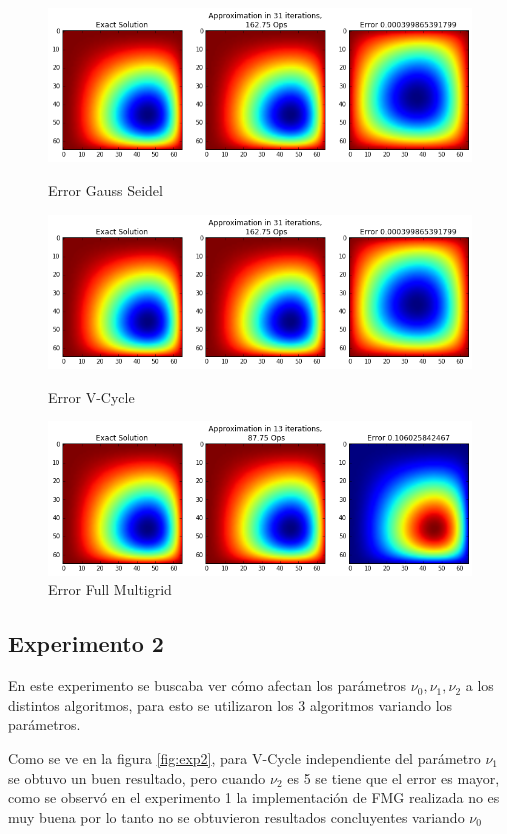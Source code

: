 \documentclass[letter, 10pt]{article}
\begin{document}
\begin{figure}[H]
    \centering
    \includegraphics[scale=0.4]{gs_e.png}
    \caption{Error Gauss Seidel }
    \label{fig:gs_e}
    \includegraphics[scale=0.4]{v_e.png}
    \caption{Error V-Cycle }
    \label{fig:v_e}
    \includegraphics[scale=0.4]{fmg_e.png}
    \caption{Error Full Multigrid }
    \label{fig:fmg_e}
\end{figure}

\subsection{Experimento 2}
En este experimento se buscaba ver cómo afectan los parámetros $\nu_0, \nu_1,\nu_2$ a los distintos algoritmos, para esto se utilizaron los 3 algoritmos variando los parámetros. 

Como se ve en la figura \ref{fig:exp2}, para V-Cycle independiente del parámetro $\nu_1$ se obtuvo un buen resultado, pero cuando $\nu_2$ es 5 se tiene que el error es mayor, como se observó en el experimento 1 la implementación de FMG realizada no es muy buena por lo tanto no se obtuvieron resultados concluyentes variando $\nu_0$
\end{document}

